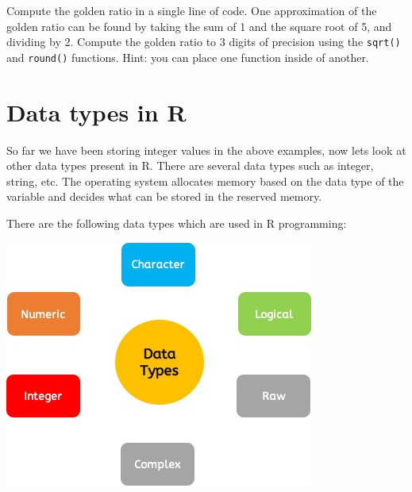 \documentclass[
]{book}
\begin{document}
Compute the golden ratio in a single line of code. One approximation of the golden ratio can be found by taking the sum of 1 and the square root of 5, and dividing by 2. Compute the golden ratio to 3 digits of precision using the \texttt{sqrt()} and \texttt{round()} functions. Hint: you can place one function inside of another.

\section{Data types in R}\label{data-types-in-r}

So far we have been storing integer values in the above examples, now lets look at other data types present in R. There are several data types such as integer, string, etc. The operating system allocates memory based on the data type of the variable and decides what can be stored in the reserved memory.

There are the following data types which are used in R programming:

\includegraphics{datatypes.jpg}
\end{document}
